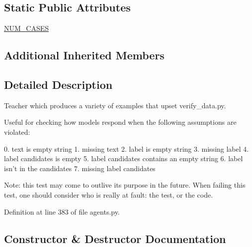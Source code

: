 \subsection*{Static Public Attributes}
\begin{DoxyCompactItemize}
\item 
\hyperlink{classparlai_1_1tasks_1_1integration__tests_1_1agents_1_1BadExampleTeacher_a6601002db5bfd2d4f70707b2fc59dc0e}{N\+U\+M\+\_\+\+C\+A\+S\+ES}
\end{DoxyCompactItemize}
\subsection*{Additional Inherited Members}


\subsection{Detailed Description}
\begin{DoxyVerb}Teacher which produces a variety of examples that upset verify_data.py.

Useful for checking how models respond when the following assumptions are
violated:

    0. text is empty string
    1. missing text
    2. label is empty string
    3. missing label
    4. label candidates is empty
    5. label candidates contains an empty string
    6. label isn't in the candidates
    7. missing label candidates

Note: this test may come to outlive its purpose in the future. When failing
this test, one should consider who is really at fault: the test, or the code.
\end{DoxyVerb}
 

Definition at line 383 of file agents.\+py.



\subsection{Constructor \& Destructor Documentation}
\mbox{\label{classparlai_1_1tasks_1_1integration__tests_1_1agents_1_1BadExampleTeacher_a977f478a2379e0f40525f3dd5408a87c}} 
